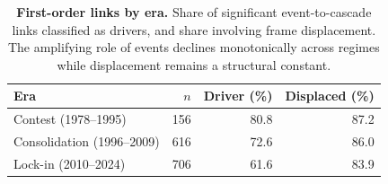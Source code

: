 \begin{table}[H]
\centering
\renewcommand{\arraystretch}{1.15}
\caption{\textbf{First-order links by era.} Share of significant
event-to-cascade links classified as drivers, and share involving frame
displacement. The amplifying role of events declines monotonically
across regimes while displacement remains a structural constant.}
\label{tab:si_first_order_era}
\vspace{0.3em}
\small
\begin{tabular}{@{}l r r r@{}}
\toprule
Era & $n$ & Driver (\%) & Displaced (\%) \\
\midrule
Contest (1978--1995) & 156 & 80.8 & 87.2 \\
Consolidation (1996--2009) & 616 & 72.6 & 86.0 \\
Lock-in (2010--2024) & 706 & 61.6 & 83.9 \\
\bottomrule
\end{tabular}
\end{table}
